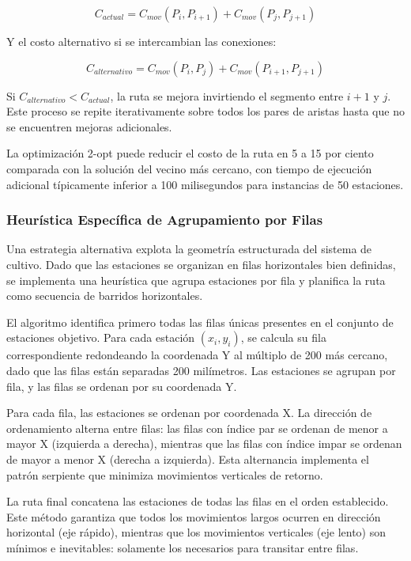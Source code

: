 \begin{equation}
C_{actual} = C_{mov}(P_i, P_{i+1}) + C_{mov}(P_j, P_{j+1})
\end{equation}

Y el costo alternativo si se intercambian las conexiones:

\begin{equation}
C_{alternativo} = C_{mov}(P_i, P_j) + C_{mov}(P_{i+1}, P_{j+1})
\end{equation}

Si $C_{alternativo} < C_{actual}$, la ruta se mejora invirtiendo el segmento entre $i+1$ y $j$. Este proceso se repite iterativamente sobre todos los pares de aristas hasta que no se encuentren mejoras adicionales.

La optimización 2-opt puede reducir el costo de la ruta en 5 a 15 por ciento comparada con la solución del vecino más cercano, con tiempo de ejecución adicional típicamente inferior a 100 milisegundos para instancias de 50 estaciones.

\subsubsection{Heurística Específica de Agrupamiento por Filas}

Una estrategia alternativa explota la geometría estructurada del sistema de cultivo. Dado que las estaciones se organizan en filas horizontales bien definidas, se implementa una heurística que agrupa estaciones por fila y planifica la ruta como secuencia de barridos horizontales.

El algoritmo identifica primero todas las filas únicas presentes en el conjunto de estaciones objetivo. Para cada estación $(x_i, y_i)$, se calcula su fila correspondiente redondeando la coordenada Y al múltiplo de 200 más cercano, dado que las filas están separadas 200 milímetros. Las estaciones se agrupan por fila, y las filas se ordenan por su coordenada Y.

Para cada fila, las estaciones se ordenan por coordenada X. La dirección de ordenamiento alterna entre filas: las filas con índice par se ordenan de menor a mayor X (izquierda a derecha), mientras que las filas con índice impar se ordenan de mayor a menor X (derecha a izquierda). Esta alternancia implementa el patrón serpiente que minimiza movimientos verticales de retorno.

La ruta final concatena las estaciones de todas las filas en el orden establecido. Este método garantiza que todos los movimientos largos ocurren en dirección horizontal (eje rápido), mientras que los movimientos verticales (eje lento) son mínimos e inevitables: solamente los necesarios para transitar entre filas.

